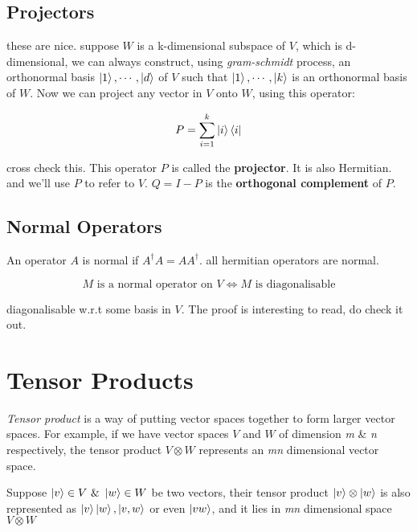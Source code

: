 \subsection{Projectors}

these are nice. suppose $W$ is a k-dimensional subspace of $V$, which is d-dimensional, we can always construct, using \textit{gram-schmidt} process, an orthonormal basis $\ket{1},\cdots,\ket{d}$ of $V$ such that $\ket{1},\cdots,\ket{k}$ is an orthonormal basis of $W$. Now we can project any vector in $V$ onto $W$, using this operator:

$$
P = \sum_{i=1}^{k}\ket{i}\bra{i}
$$

cross check this. This operator $P$ is called the \textbf{projector}. It is also Hermitian. and we'll use $P$ to refer to $V$. $Q = I - P$ is the \textbf{orthogonal complement} of $P$.

\subsection{Normal Operators}

An operator $A$ is normal if $A^\dag A = AA^\dag$. all hermitian operators are normal.


\begin{theorem}
    
\label{thm:spectral_decomposition}

$$
M \text{ is a normal operator on } V \iff M \text{ is diagonalisable}
$$

diagonalisable w.r.t some basis in $V$. The proof is interesting to read, do check it out.
\end{theorem}

\section{Tensor Products}
\textit{Tensor product} is a way of putting vector spaces together to form larger vector spaces. For example, if we have vector spaces $V$ and $W$ of dimension \textit{m} \& \textit{n} respectively, the tensor product $V\otimes W$ represents an \textit{mn} dimensional vector space. 

Suppose $\ket{v} \in V \ \& \ \ket{w} \in W$ be two vectors, their tensor product $\ket{v} \otimes \ket{w}$ is also represented as $\ket{v}\ket{w}, \ket{v,w}$ or even $\ket{vw}$, and it lies in \textit{mn} dimensional space $V \otimes W$

